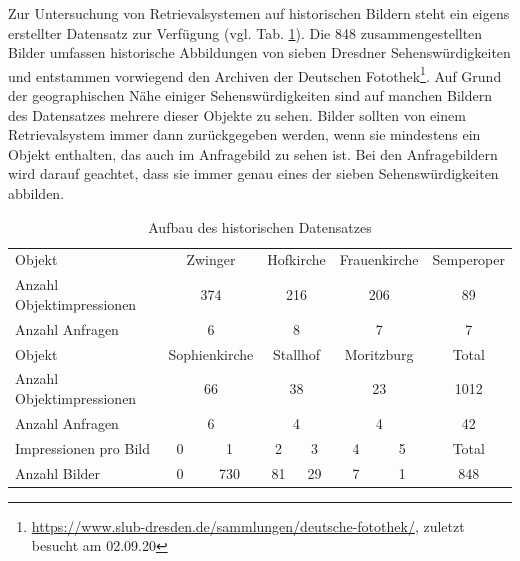 Zur Untersuchung von Retrievalsystemen auf historischen Bildern steht ein eigens erstellter Datensatz zur Verfügung (vgl. Tab. \ref{hist4d_data}). Die 848 zusammengestellten Bilder umfassen historische Abbildungen von sieben Dresdner Sehenswürdigkeiten und entstammen vorwiegend den Archiven der Deutschen Fotothek\footnote{\url{https://www.slub-dresden.de/sammlungen/deutsche-fotothek/}, zuletzt besucht am 02.09.20}. Auf Grund der geographischen Nähe einiger Sehenswürdigkeiten sind auf manchen Bildern des Datensatzes mehrere dieser Objekte zu sehen. Bilder sollten von einem Retrievalsystem immer dann zurückgegeben werden, wenn sie mindestens ein Objekt enthalten, das auch im Anfragebild zu sehen ist. Bei den Anfragebildern wird darauf geachtet, dass sie immer genau eines der sieben Sehenswürdigkeiten abbilden.
\\
\begin{table}[h]
\centering

\begin{tabular}{l|c|c|c|c|c|c|c}
\rowcolor[HTML]{C0C0C0} 
Objekt &
  \multicolumn{2}{c|}{\cellcolor[HTML]{C0C0C0}Zwinger} &
  \multicolumn{2}{c|}{\cellcolor[HTML]{C0C0C0}Hofkirche} &
  \multicolumn{2}{c|}{\cellcolor[HTML]{C0C0C0}Frauenkirche} &
  Semperoper \\
Anzahl Objektimpressionen & \multicolumn{2}{c|}{374} & \multicolumn{2}{c|}{216} & \multicolumn{2}{c|}{206} & 89    \\
Anzahl Anfragen           & \multicolumn{2}{c|}{6}   & \multicolumn{2}{c|}{8}   & \multicolumn{2}{c|}{7}   & 7     \\ \hline
\rowcolor[HTML]{C0C0C0} 
Objekt &
  \multicolumn{2}{c|}{\cellcolor[HTML]{C0C0C0}Sophienkirche} &
  \multicolumn{2}{c|}{\cellcolor[HTML]{C0C0C0}Stallhof} &
  \multicolumn{2}{c|}{\cellcolor[HTML]{C0C0C0}Moritzburg} &
  Total \\
Anzahl Objektimpressionen & \multicolumn{2}{c|}{66}  & \multicolumn{2}{c|}{38}  & \multicolumn{2}{c|}{23}  & 1012  \\
Anzahl Anfragen           & \multicolumn{2}{c|}{6}   & \multicolumn{2}{c|}{4}   & \multicolumn{2}{c|}{4}   & 42    \\ \hline
\rowcolor[HTML]{C0C0C0} 
Impressionen pro Bild     & \hspace{2.5mm} 0 \hspace{2.5mm}         & 1           & \hspace{1.1mm} 2 \hspace{1.1mm}           & 3          & \hspace{2mm} 4 \hspace{2mm}           & 5          & Total \\
Anzahl Bilder             & 0          & 730         & 81          & 29         & 7           & 1          & 848  
\end{tabular}%

\caption{Aufbau des historischen Datensatzes}
\label{hist4d_data}
\end{table}
